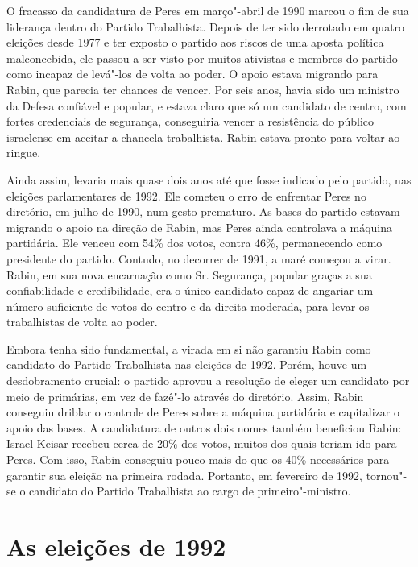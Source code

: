 O fracasso da candidatura de Peres em março"-abril de 1990 marcou o fim
de sua liderança dentro do Partido Trabalhista. Depois de ter sido
derrotado em quatro eleições desde 1977 e ter exposto o partido aos
riscos de uma aposta política malconcebida, ele passou a ser visto por
muitos ativistas e membros do partido como incapaz de levá"-los de volta
ao poder. O apoio estava migrando para Rabin, que parecia ter chances de
vencer. Por seis anos, havia sido um ministro da Defesa confiável e
popular, e estava claro que só um candidato de centro, com fortes
credenciais de segurança, conseguiria vencer a resistência do público
israelense em aceitar a chancela trabalhista. Rabin estava pronto para
voltar ao ringue.

Ainda assim, levaria mais quase dois anos até que fosse indicado pelo
partido, nas eleições parlamentares de 1992. Ele cometeu o erro de
enfrentar Peres no diretório, em julho de 1990, num gesto prematuro. As
bases do partido estavam migrando o apoio na direção de Rabin, mas Peres
ainda controlava a máquina partidária. Ele venceu com 54\% dos votos,
contra 46\%, permanecendo como presidente do partido. Contudo, no
decorrer de 1991, a maré começou a virar. Rabin, em sua nova encarnação
como Sr. Segurança, popular graças a sua confiabilidade e credibilidade,
era o único candidato capaz de angariar um número suficiente de votos do
centro e da direita moderada, para levar os trabalhistas de volta ao
poder.

Embora tenha sido fundamental, a virada em si não garantiu Rabin como
candidato do Partido Trabalhista nas eleições de 1992. Porém, houve um
desdobramento crucial: o partido aprovou a resolução de eleger um
candidato por meio de primárias, em vez de fazê"-lo através do diretório.
Assim, Rabin conseguiu driblar o controle de Peres sobre a máquina
partidária e capitalizar o apoio das bases. A candidatura de outros dois
nomes também beneficiou Rabin: Israel Keisar recebeu cerca de 20\% dos
votos, muitos dos quais teriam ido para Peres. Com isso, Rabin conseguiu
pouco mais do que os 40\% necessários para garantir sua eleição na
primeira rodada. Portanto, em fevereiro de 1992, tornou"-se o candidato
do Partido Trabalhista ao cargo de primeiro"-ministro.

\section{As eleições de 1992}

